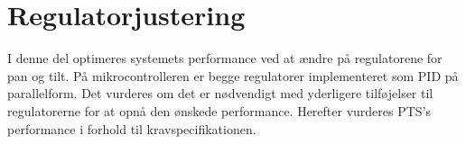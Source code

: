\part{Regulatorjustering}
I denne del optimeres systemets performance ved at ændre på regulatorene for pan og tilt. 
På mikrocontrolleren er begge regulatorer implementeret som PID på parallelform.
Det vurderes om det er nødvendigt med yderligere tilføjelser til regulatorerne 
for at opnå den ønskede performance.
Herefter vurderes PTS's performance i forhold til kravspecifikationen.

